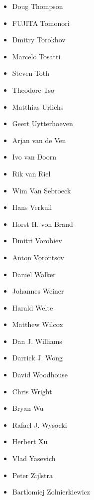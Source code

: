 \documentclass[a4paper,8pt,english]{sphinxmanual}
\begin{document}
\begin{itemize}
\item {} 
Doug Thompson

\item {} 
FUJITA Tomonori

\item {} 
Dmitry Torokhov

\item {} 
Marcelo Tosatti

\item {} 
Steven Toth

\item {} 
Theodore Tso

\item {} 
Matthias Urlichs

\item {} 
Geert Uytterhoeven

\item {} 
Arjan van de Ven

\item {} 
Ivo van Doorn

\item {} 
Rik van Riel

\item {} 
Wim Van Sebroeck

\item {} 
Hans Verkuil

\item {} 
Horst H. von Brand

\item {} 
Dmitri Vorobiev

\item {} 
Anton Vorontsov

\item {} 
Daniel Walker

\item {} 
Johannes Weiner

\item {} 
Harald Welte

\item {} 
Matthew Wilcox

\item {} 
Dan J. Williams

\item {} 
Darrick J. Wong

\item {} 
David Woodhouse

\item {} 
Chris Wright

\item {} 
Bryan Wu

\item {} 
Rafael J. Wysocki

\item {} 
Herbert Xu

\item {} 
Vlad Yasevich

\item {} 
Peter Zijlstra

\item {} 
Bartlomiej Zolnierkiewicz

\end{itemize}
\end{document}
